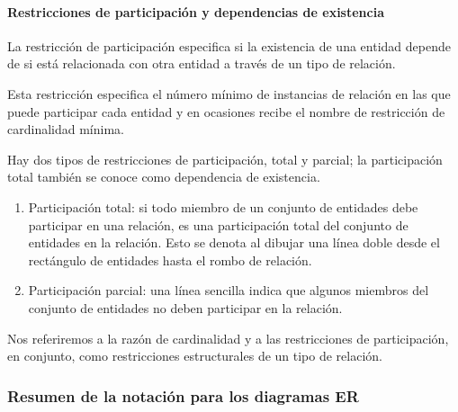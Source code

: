 \paragraph*{Restricciones de participación y dependencias de existencia}
La restricción de participación especifica si la existencia de una entidad depende de si está relacionada con otra entidad a través de un tipo de relación.


Esta restricción especifica el número mínimo de instancias de relación en las que puede participar cada entidad y en ocasiones recibe el nombre de restricción de cardinalidad mínima.


Hay dos tipos de restricciones de participación, total y parcial; la participación total también se conoce como dependencia de existencia.

\begin{enumerate}
    \item Participación total: si todo miembro de un conjunto de entidades debe participar en una relación, es una participación total del conjunto de entidades en la relación. Esto se denota al dibujar una línea doble desde el rectángulo de entidades hasta el rombo de relación.
    \item Participación parcial: una línea sencilla indica que algunos miembros del conjunto de entidades no deben participar en la relación.
    \end{enumerate}

Nos referiremos a la razón de cardinalidad y a las restricciones de participación, en conjunto, como restricciones estructurales de un tipo de relación.





\subsubsection{Resumen de la notación para los diagramas ER}

